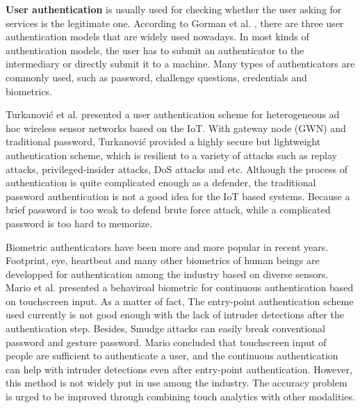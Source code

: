 \textbf{User authentication} is usually used for checking whether the user asking for services is the legitimate one. According to Gorman et al. \cite{o2003comparing}, there are three user authentication models that are widely used nowadays. In most kinds of authentication models, the user has to submit an authenticator to the intermediary or directly submit it to a machine. Many types of authenticators are commonly used, such as password, challenge questions, credentials and biometrics.

Turkanovi{\'c} et al. \cite{turkanovic2014novel} presented a user authentication scheme for heterogeneous ad hoc wireless sensor networks based on the IoT. With gateway node (GWN) and traditional password, Turkanovi{\'c} provided a highly secure but lightweight authentication scheme, which is resilient to a variety of attacks such as replay attacks, privileged-insider attacks, DoS attacks and etc. Although the process of authentication is quite complicated enough as a defender, the traditional password authentication is not a good idea for the IoT based systems. Because a brief password is too weak to defend brute force attack, while a complicated password is too hard to memorize.

Biometric authenticators have been more and more popular in recent years. Footprint, eye, heartbeat and many other biometrics of human beings are developped for authentication among the industry based on diverse sensors. Mario et al. \cite{DBLP:journals/tifs/FrankBMMS13} presented a behaviroal biometric for continuous authentication based on touchscreen input. As a matter of fact, The entry-point authentication scheme used currently is not good enough with the lack of intruder detections after the authentication step. Besides, Smudge attacks can easily break conventional password and gesture password. Mario concluded that touchscreen input of people are sufficient to authenticate a user, and the continuous authentication can help with intruder detections even after entry-point authentication. However, this method is not widely put in use among the industry. The accuracy problem is urged to be improved through combining touch analytics with other modalities.